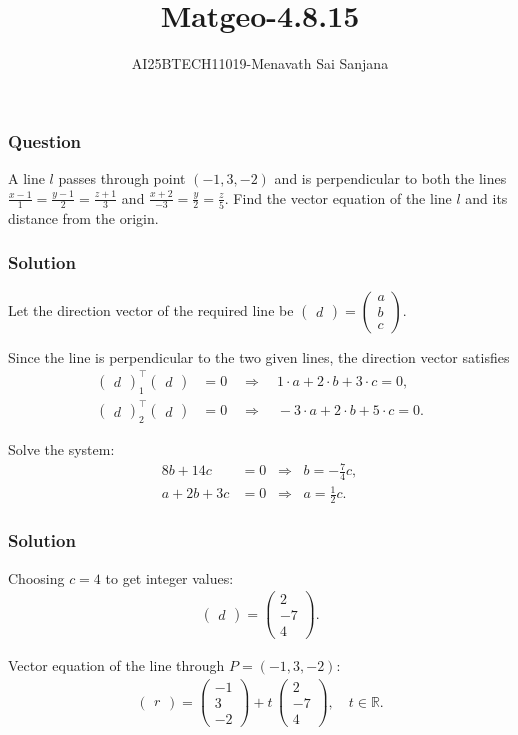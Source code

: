\documentclass{beamer}
\title{Matgeo-4.8.15}
\author{AI25BTECH11019-Menavath Sai Sanjana}
\date{}
\theoremstyle{remark}
\renewcommand{\vec}[1]{\begin{pmatrix}#1\end{pmatrix}}
\begin{document}
  
\begin{frame}  
\titlepage  
\end{frame}  
   

\begin{frame}  
\frametitle{Question}  
A line $l$ passes through point $(-1,3,-2)$ and is perpendicular to both the lines  
$\frac{x-1}{1} = \frac{y-1}{2} = \frac{z+1}{3}$ and  
$\frac{x+2}{-3} = \frac{y}{2} = \frac{z}{5}$. Find the vector equation of the line $l$ and its distance from the origin.  
\end{frame}  

\begin{frame}  
\frametitle{Solution } 

Let the direction vector of the required line be  
$
\vec{d} = \vec{a\\b\\c}.
$

Since the line is perpendicular to the two given lines, the direction vector satisfies
\begin{align}  
\vec{d}_1^\top \vec{d} &= 0 \quad \Rightarrow \quad 1\cdot a + 2\cdot b + 3\cdot c = 0,\\  
\vec{d}_2^\top \vec{d} &= 0 \quad \Rightarrow \quad -3\cdot a + 2\cdot b + 5\cdot c = 0.
\end{align}  


Solve the system:  
\begin{align}  
8b + 14c &= 0 \;\;\Rightarrow\;\; b = -\frac{7}{4}c,\\  
a + 2b + 3c &= 0 \;\;\Rightarrow\;\; a = \frac{1}{2}c.
\end{align}  
\end{frame}

\begin{frame}
\frametitle{Solution}
Choosing $c=4$ to get integer values:  
\begin{align}  
\vec{d} = \vec{2\\-7\\4}.
\end{align}  

Vector equation of the line through $P=(-1,3,-2)$:  
\begin{align}  
\vec{r} = \vec{-1\\3\\-2} + t\,\vec{2\\-7\\4}, \quad t \in \mathbb{R}.
\end{align}  

\end{frame}
\end{document}
